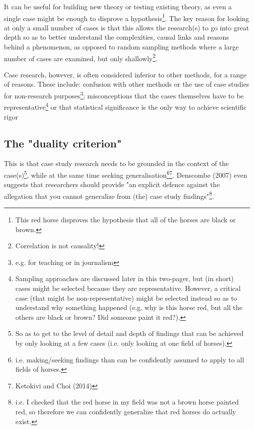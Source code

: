 \documentclass{tufte-handout}
\begin{document}
It can be useful for building new theory 
or testing existing theory, 
as even a single case might be enough to disprove 
a hypothesis\footnote{
This red horse disproves the hypothesis that all of the horses are black or brown.}.
The key reason for looking at only a small number of cases is that 
this allows the research(s) to go into great depth so as to better understand 
the complexities, causal links and reasons behind a phenomenon, 
as opposed to random sampling methods where a large number of cases are examined, but only shallowly\cite{Denscombe2007aa}\footnote{Correlation is not causality!}.

Case research, however, is often considered inferior to other methods, for a range of reasons. These include: confusion with other methods or the use of case studies for non-research purposes\footnote{e.g. for teaching or in journalism}; misconceptions that the cases themselves have to be representative\footnote{Sampling approaches are discussed later in this two-pager, but (in short) cases might be selected because they are representative. However, a critical case (that might be non-representative) might be selected instead so as to understand why something happened (e.g. why is this horse red, but all the others are black or brown? Did someone paint it red?).} or that statistical significance is the only way to achieve scientific rigor\cite{Bonoma1984aa,}


\subsection{The "duality criterion"}
This is that case study research needs to be grounded in the context of the case(s)\footnote{So as to get to the level of detail and depth of findings that can be achieved by only looking at a few cases (i.e. only looking at one field of horses).}, while at the same time seeking generalisation\footnote{i.e. making/seeking findings than can be confidently assumed to apply to all fields of horses.}\footnote{Ketokivi and Choi (2014)}. Denscombe (2007) even suggests that researchers should provide "an explicit defence against the allegation that you cannot generalize from (the) case study findings"\footnote{i.e. I checked that the red horse in my field was not a brown horse painted red, so therefore we can confidently generalize that red horses do actually exist.}. 
\end{document}
